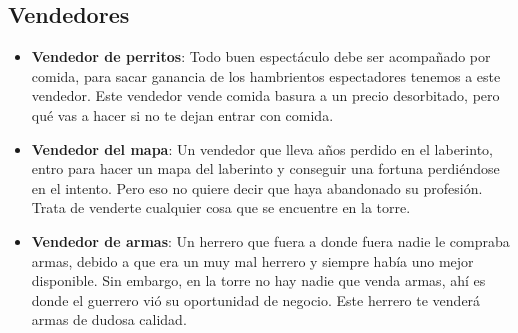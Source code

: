 \subsection{Vendedores}

\begin{itemize}
    \item \textbf{Vendedor de perritos}: Todo buen espectáculo debe ser acompañado por comida, para sacar ganancia de los hambrientos espectadores tenemos a este vendedor. Este vendedor vende comida basura a un precio desorbitado, pero qué vas a hacer si no te dejan entrar con comida.
    \item \textbf{Vendedor del mapa}: Un vendedor que lleva años perdido en el laberinto, entro para hacer un mapa del laberinto y conseguir una fortuna perdiéndose en el intento. Pero eso no quiere decir que haya abandonado su profesión. Trata de venderte cualquier cosa que se encuentre en la torre.
    \item \textbf{Vendedor de armas}: Un herrero que fuera a donde fuera nadie le compraba armas, debido a que era un muy mal herrero y siempre había uno mejor disponible. Sin embargo, en la torre no hay nadie que venda armas, ahí es donde el guerrero vió su oportunidad de negocio. Este herrero te venderá armas de dudosa calidad.
\end{itemize}